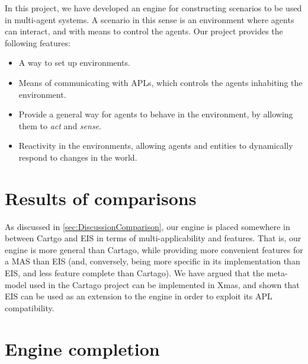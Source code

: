 In this project, we have developed an engine for constructing scenarios
to be used in multi-agent systems. A scenario in this sense is an
environment where agents can interact, and with means to control the
agents. Our project provides the following features:
\begin{itemize}
\item A way to set up environments.
\item Means of communicating with APLs, which controls the agents inhabiting
the environment.
\item Provide a general way for agents to behave in the environment, by
allowing them to \emph{act} and \emph{sense}.
\item Reactivity in the environments, allowing agents and entities to dynamically
respond to changes in the world.
\end{itemize}

\section{Results of comparisons}

As discussed in \ref{sec:DiscussionComparison}, our engine is placed
somewhere in between Cartgo and EIS in terms of multi-applicability
and features. That is, our engine is more general than Cartago, while
providing more convenient features for a MAS than EIS (and, conversely,
being more specific in its implementation than EIS, and less feature
complete than Cartago). We have argued that the meta-model used in
the Cartago project can be implemented in Xmas, and shown that EIS
can be used as an extension to the engine in order to exploit its
APL compatibility.


\section{Engine completion}

